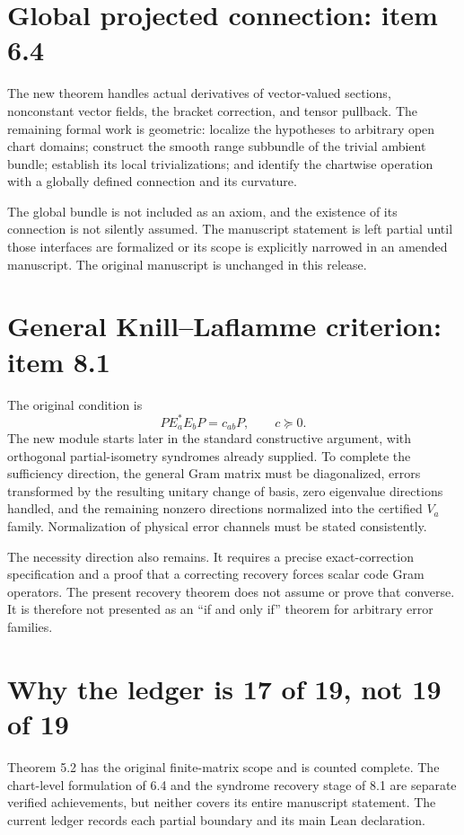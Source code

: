 \documentclass[10pt,letterpaper]{article}
\newcommand{\pageheading}[2]{\vspace*{2pt}{\small\color{ink}\textsc{#1}}\par\vspace{2pt}{\Large\bfseries #2}\par\vspace{4pt}}
\begin{document}
\newpage
\pageheading{Coverage and unfinished obligations}{Two partial statements remain}
\section*{Global projected connection: item 6.4}
The new theorem handles actual derivatives of vector-valued sections, nonconstant vector fields, the bracket correction, and tensor pullback. The remaining formal work is geometric: localize the hypotheses to arbitrary open chart domains; construct the smooth range subbundle of the trivial ambient bundle; establish its local trivializations; and identify the chartwise operation with a globally defined connection and its curvature.

The global bundle is not included as an axiom, and the existence of its connection is not silently assumed. The manuscript statement is left partial until those interfaces are formalized or its scope is explicitly narrowed in an amended manuscript. The original manuscript is unchanged in this release.

\section*{General Knill--Laflamme criterion: item 8.1}
The original condition is
\[
P E_a^*E_bP=c_{ab}P,\qquad c\succeq0.
\]
The new module starts later in the standard constructive argument, with orthogonal partial-isometry syndromes already supplied. To complete the sufficiency direction, the general Gram matrix must be diagonalized, errors transformed by the resulting unitary change of basis, zero eigenvalue directions handled, and the remaining nonzero directions normalized into the certified $V_a$ family. Normalization of physical error channels must be stated consistently.

The necessity direction also remains. It requires a precise exact-correction specification and a proof that a correcting recovery forces scalar code Gram operators. The present recovery theorem does not assume or prove that converse. It is therefore not presented as an ``if and only if'' theorem for arbitrary error families.

\section*{Why the ledger is 17 of 19, not 19 of 19}
Theorem 5.2 has the original finite-matrix scope and is counted complete. The chart-level formulation of 6.4 and the syndrome recovery stage of 8.1 are separate verified achievements, but neither covers its entire manuscript statement. The current ledger records each partial boundary and its main Lean declaration.
\end{document}
